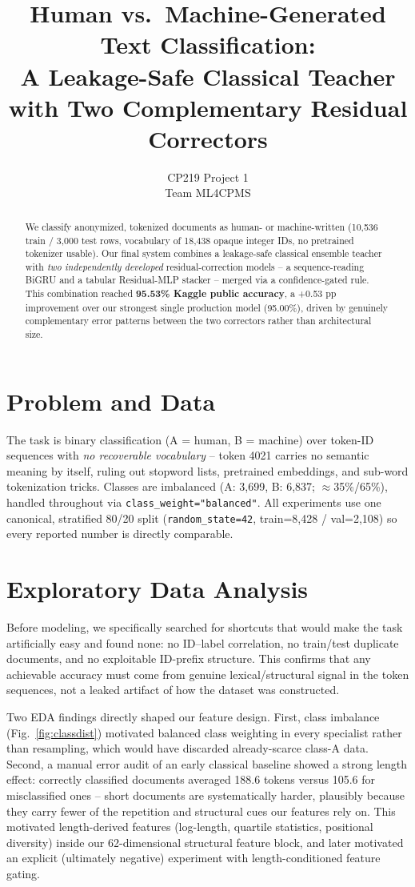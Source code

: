 \documentclass[10pt,twocolumn]{article}
\title{\vspace{-1.2em}Human vs.\ Machine-Generated Text Classification:\\
\large A Leakage-Safe Classical Teacher with Two Complementary Residual Correctors\vspace{-0.5em}}
\author{CP219 Project 1 \\ \small Team ML4CPMS}
\date{}
\begin{document}
\maketitle
\vspace{-2.2em}

\begin{abstract}
\small
We classify anonymized, tokenized documents as human- or machine-written (10{,}536 train / 3{,}000 test rows, vocabulary of 18{,}438 opaque integer IDs, no pretrained tokenizer usable). Our final system combines a leakage-safe classical ensemble teacher with \emph{two independently developed} residual-correction models -- a sequence-reading BiGRU and a tabular Residual-MLP stacker -- merged via a confidence-gated rule. This combination reached \textbf{95.53\% Kaggle public accuracy}, a +0.53 pp improvement over our strongest single production model (95.00\%), driven by genuinely complementary error patterns between the two correctors rather than architectural size.
\end{abstract}

\section{Problem and Data}
The task is binary classification (A = human, B = machine) over token-ID sequences with \emph{no recoverable vocabulary} -- token 4021 carries no semantic meaning by itself, ruling out stopword lists, pretrained embeddings, and sub-word tokenization tricks. Classes are imbalanced (A: 3{,}699, B: 6{,}837; $\approx$35\%/65\%), handled throughout via \texttt{class\_weight="balanced"}. All experiments use one canonical, stratified 80/20 split (\texttt{random\_state=42}, train=8{,}428 / val=2{,}108) so every reported number is directly comparable.

\section{Exploratory Data Analysis}
Before modeling, we specifically searched for shortcuts that would make the task artificially easy and found none: no ID--label correlation, no train/test duplicate documents, and no exploitable ID-prefix structure. This confirms that any achievable accuracy must come from genuine lexical/structural signal in the token sequences, not a leaked artifact of how the dataset was constructed.

Two EDA findings directly shaped our feature design. First, class imbalance (Fig.~\ref{fig:classdist}) motivated balanced class weighting in every specialist rather than resampling, which would have discarded already-scarce class-A data. Second, a manual error audit of an early classical baseline showed a strong length effect: correctly classified documents averaged 188.6 tokens versus 105.6 for misclassified ones -- short documents are systematically harder, plausibly because they carry fewer of the repetition and structural cues our features rely on. This motivated length-derived features (log-length, quartile statistics, positional diversity) inside our 62-dimensional structural feature block, and later motivated an explicit (ultimately negative) experiment with length-conditioned feature gating.
\end{document}
